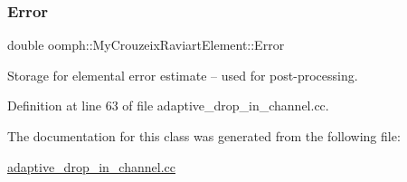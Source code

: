 \subsubsection{\texorpdfstring{Error}{Error}}
{\footnotesize\ttfamily double oomph\+::\+My\+Crouzeix\+Raviart\+Element\+::\+Error\hspace{0.3cm}{\ttfamily [private]}}



Storage for elemental error estimate -- used for post-\/processing. 



Definition at line 63 of file adaptive\+\_\+drop\+\_\+in\+\_\+channel.\+cc.



The documentation for this class was generated from the following file\+:\begin{DoxyCompactItemize}
\item 
\hyperlink{adaptive__drop__in__channel_8cc}{adaptive\+\_\+drop\+\_\+in\+\_\+channel.\+cc}\end{DoxyCompactItemize}
